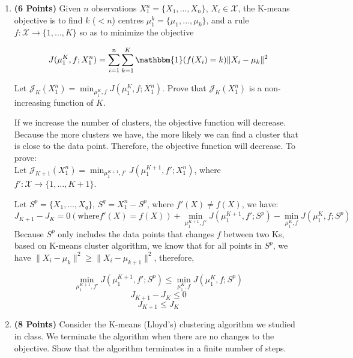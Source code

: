 \documentclass[a4paper]{article}
\newcounter{thm}
\newcommand{\Xcal}{\mathcal{X}}
\newcommand{\Jcal}{\mathcal{J}}
\newcommand{\indfone}{\mathbbm{1}}
\theoremstyle{definition}
\newenvironment{soln}{
    \leavevmode\color{blue}\ignorespaces
}{}
\begin{document}
\begin{enumerate}

	\item \textbf{(6 Points)}
	      Given $n$ observations $X_1^n = \{X_1, \dots, X_n\}$, $X_i \in \Xcal$, the K-means objective
	      is to find $k$
	      ($<n$) centres $\mu_1^k = \{\mu_1, \dots, \mu_k\}$, and a rule $f:\Xcal \rightarrow
		      \{1,\dots, K\}$ so as to minimize the objective

	      \begin{equation}
		      J(\mu_1^K, f; X_1^n) = \sum_{i=1}^n \sum_{k=1}^K \indfone(f(X_i) = k) \|X_i - \mu_k\|^2
		      \label{eqn:kmeans}
	      \end{equation}

	      Let $\Jcal_K(X_1^n) = \min_{\mu_1^K, f} J(\mu_1^K, f; X_1^n)$. Prove that
	      $\Jcal_{K}(X_1^n)$ is a non-increasing function of $K$.

	      \begin{soln}
		      If we increase the number of clusters, the objective function will decrease. Because the more clusters we have, the more likely we can find a cluster that is close to the data point. Therefore, the objective function will decrease. To prove:\\

		      Let $\Jcal_{K+1}(X_1^n) = \min_{\mu_1^{K+1}, f'} J(\mu_1^{K+1}, f'; X_1^n)$, where $f': \Xcal \rightarrow \{1,\dots, K+1\}$.

		      Let $S^p = \{X_1, \dots, X_q\}$, $S^q = X_1^n - S^p$, where $f'(X) \neq f(X)$, we have:
		      \[
			      J_{K+1} - J_K = 0 (\text{where} f'(X) = f(X)) + \min_{\mu_1^{K+1}, f'} J(\mu_1^{K+1}, f'; S^p) - \min_{\mu_1^K, f}J(\mu_1^K, f; S^p)
		      \]
		      Because $S^p$ only includes the data points that changes $f$ between two Ks, based on K-means cluster algorithm, we know that for all points in $S^p$, we have $\|X_i - \mu_k\|^2 \geq \|X_i - \mu_{k+1}\|^2$, therefore,

		      \[
			      \min_{\mu_1^{K+1}, f'} J(\mu_1^{K+1}, f'; S^p) \leq \min_{\mu_1^K, f}J(\mu_1^K, f; S^p)
		      \]
		      \[
			      J_{K+1} - J_K \leq 0
		      \]
		      \[
			      J_{K+1} \leq J_K
		      \]
	      \end{soln}

	      \pagebreak
	\item \textbf{(8 Points)}
	      Consider the K-means (Lloyd's) clustering algorithm we studied in class. We
	      terminate the algorithm when there are no changes to the objective.
	      Show that the algorithm terminates in a finite number of steps.


\end{enumerate}
\end{document}
